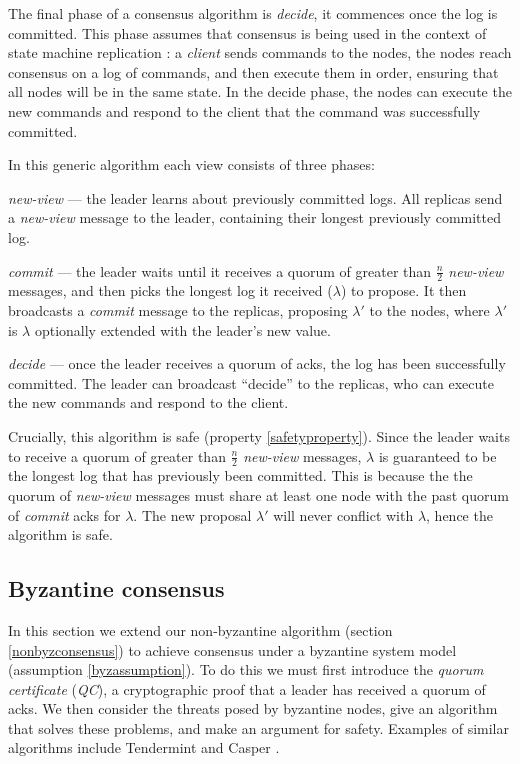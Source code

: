 The final phase of a consensus algorithm is \textit{decide}, it commences once the log is committed. This phase assumes that consensus is being used in the context of state machine replication \cite{lamportTimeClocksOrdering1978,schneiderImplementingFaulttolerantServices1990}: a \textit{client} sends commands to the nodes, the nodes reach consensus on a log of commands, and then execute them in order, ensuring that all nodes will be in the same state. In the decide phase, the nodes can execute the new commands and respond to the client that the command was successfully committed.

In this generic algorithm each view consists of three phases:

\begin{description}
	\item \textit{new-view} --- the leader learns about previously committed logs. All replicas send a \textit{new-view} message to the leader, containing their longest previously committed log.
	\item \textit{commit} --- the leader waits until it receives a quorum of greater than $\frac{n}{2}$ \textit{new-view} messages, and then picks the longest log it received ($\lambda$) to propose. It then broadcasts a \textit{commit} message to the replicas, proposing $\lambda'$ to the nodes, where $\lambda'$ is $\lambda$ optionally extended with the leader's new value.
	\item \textit{decide} --- once the leader receives a quorum of acks, the log has been successfully committed. The leader can broadcast ``decide'' to the replicas, who can execute the new commands and respond to the client.
\end{description}

Crucially, this algorithm is safe (property \ref{safetyproperty}). Since the leader waits to receive a quorum of greater than $\frac{n}{2}$ \textit{new-view} messages, $\lambda$ is guaranteed to be the longest log that has previously been committed. This is because the the quorum of \textit{new-view} messages must share at least one node with the past quorum of \textit{commit} acks for $\lambda$. The new proposal $\lambda'$ will never conflict with $\lambda$, hence the algorithm is safe.

\subsection{Byzantine consensus} \label{byzconsensus}
In this section we extend our non-byzantine algorithm (section \ref{nonbyzconsensus}) to achieve consensus under a byzantine system model (assumption \ref{byzassumption}). To do this we must first introduce the \textit{quorum certificate} (\textit{QC}), a cryptographic proof that a leader has received a quorum of acks. We then consider the threats posed by byzantine nodes, give an algorithm that solves these problems, and make an argument for safety. Examples of similar algorithms include Tendermint \cite{kwonTendermintConsensusMining2014} and Casper \cite{buterinCasperFriendlyFinality2019}.

